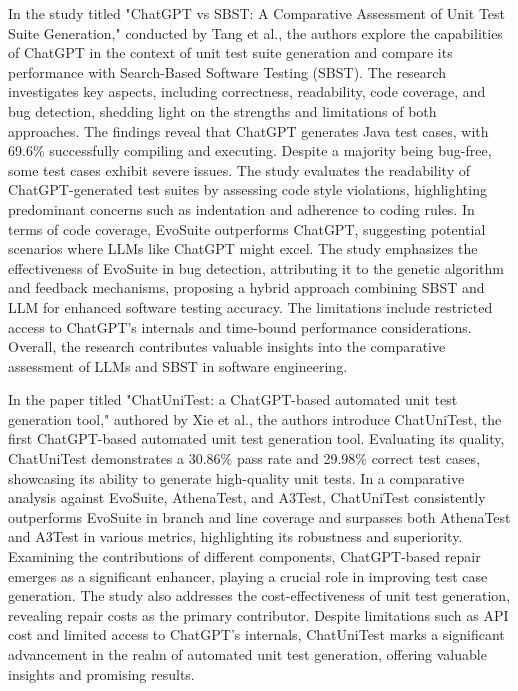 In the study titled "ChatGPT vs SBST: A Comparative Assessment of Unit Test Suite Generation,"\cite{tang_chatgpt_2023} conducted by Tang et al., the authors explore the capabilities of ChatGPT in the context of unit test suite generation and compare its performance with Search-Based Software Testing (SBST). The research investigates key aspects, including correctness, readability, code coverage, and bug detection, shedding light on the strengths and limitations of both approaches. The findings reveal that ChatGPT generates Java test cases, with 69.6\% successfully compiling and executing. Despite a majority being bug-free, some test cases exhibit severe issues. The study evaluates the readability of ChatGPT-generated test suites by assessing code style violations, highlighting predominant concerns such as indentation and adherence to coding rules. In terms of code coverage, EvoSuite outperforms ChatGPT, suggesting potential scenarios where LLMs like ChatGPT might excel. The study emphasizes the effectiveness of EvoSuite in bug detection, attributing it to the genetic algorithm and feedback mechanisms, proposing a hybrid approach combining SBST and LLM for enhanced software testing accuracy. The limitations include restricted access to ChatGPT's internals and time-bound performance considerations. Overall, the research contributes valuable insights into the comparative assessment of LLMs and SBST in software engineering.

In the paper titled "ChatUniTest: a ChatGPT-based automated unit test generation tool," authored by Xie et al., the authors introduce ChatUniTest\cite{xie_chatunitest_2023}, the first ChatGPT-based automated unit test generation tool. Evaluating its quality, ChatUniTest demonstrates a 30.86\% pass rate and 29.98\% correct test cases, showcasing its ability to generate high-quality unit tests. In a comparative analysis against EvoSuite, AthenaTest, and A3Test, ChatUniTest consistently outperforms EvoSuite in branch and line coverage and surpasses both AthenaTest and A3Test in various metrics, highlighting its robustness and superiority. Examining the contributions of different components, ChatGPT-based repair emerges as a significant enhancer, playing a crucial role in improving test case generation. The study also addresses the cost-effectiveness of unit test generation, revealing repair costs as the primary contributor. Despite limitations such as API cost and limited access to ChatGPT's internals, ChatUniTest marks a significant advancement in the realm of automated unit test generation, offering valuable insights and promising results.

